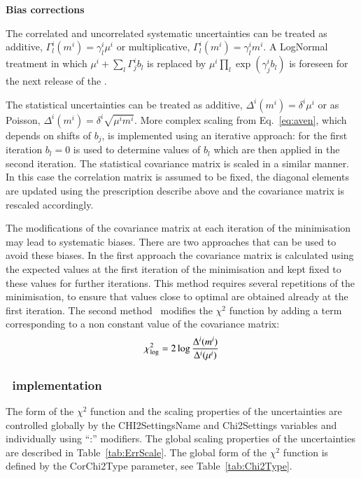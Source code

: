 \begin{description}
\item \bf{Bias corrections}\rm

The correlated and uncorrelated systematic uncertainties can be treated as additive,  $\Gamma^i_l(m^i) = \gamma^i_l \mu^i$
or multiplicative, $\Gamma^i_l(m^i) = \gamma^i_l m^i$. A LogNormal treatment in which 
$ \mu^i + \sum_l \Gamma^i_j b_l$ is replaced by $ \mu^i \prod_l \exp( \gamma^i_j b_l) $ is foreseen for the
next release of the \fitter. 

The statistical uncertainties can be treated as additive, $\Delta^i(m^i) = \delta^i \mu^i$  or as Poisson,
$\Delta^i(m^i) = \delta^i \sqrt{\mu^i m^i}$. More complex scaling from Eq.~\ref{eq:aven}, 
which depends on shifts of $b_j$, is implemented using an iterative approach: for the first iteration $b_l =0$ 
 is used to determine values of $b_l$ which are then applied in the second iteration. The statistical covariance
matrix is scaled in a similar manner. In this case the correlation matrix is assumed to be fixed, the diagonal
elements are updated using the prescription describe above and the covariance matrix is rescaled accordingly.

The modifications of the covariance matrix at each iteration of the \minuit minimisation may lead to systematic
biases. There are two approaches that can be used to avoid these biases. In the first approach the covariance matrix is calculated
using the expected values at the first iteration of the minimisation and kept fixed to these values for further
iterations. This method requires several repetitions of the minimisation, to ensure that values close to optimal
are obtained already at the first iteration. The second method~\cite{h1:2012kk} modifies the $\chi^2$ function by adding a term
corresponding to a non constant value of the covariance matrix:
\begin{equation}
 \chi^2_{\rm log} = 2 \log \frac{\Delta^i(m^i)}{\Delta^i(\mu^i)} 
\end{equation}  
\end{description}


\subsubsection{\fitter\ implementation}
The form of the $\chi^2$ function and the scaling properties of the 
uncertainties are controlled globally by the {\sc CHI2SettingsName} and
{\sc  Chi2Settings} variables and individually using {\sc ``:''} modifiers.
The global scaling properties of the uncertainties are described in 
Table~\ref{tab:ErrScale}. The global form of the $\chi^2$ function
is defined by the {\sc CorChi2Type} parameter, see   
Table~\ref{tab:Chi2Type}.

